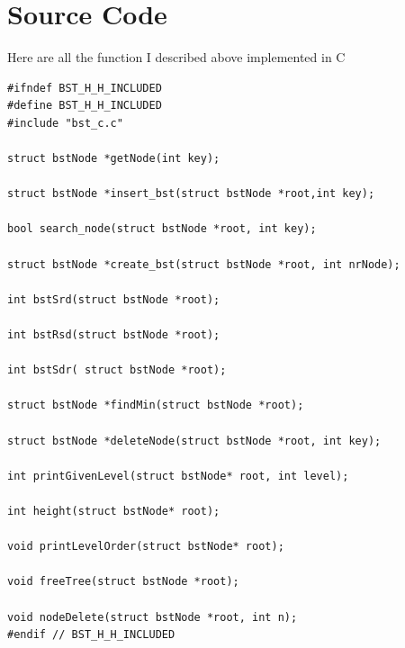 \documentclass{article}
\begin{document}
\section{Source Code}
Here are all the function I described above implemented in C
\begin{lstlisting}
#ifndef BST_H_H_INCLUDED
#define BST_H_H_INCLUDED
#include "bst_c.c"

struct bstNode *getNode(int key);

struct bstNode *insert_bst(struct bstNode *root,int key);

bool search_node(struct bstNode *root, int key);

struct bstNode *create_bst(struct bstNode *root, int nrNode);

int bstSrd(struct bstNode *root);

int bstRsd(struct bstNode *root);

int bstSdr( struct bstNode *root);

struct bstNode *findMin(struct bstNode *root);

struct bstNode *deleteNode(struct bstNode *root, int key);

int printGivenLevel(struct bstNode* root, int level);

int height(struct bstNode* root);

void printLevelOrder(struct bstNode* root);

void freeTree(struct bstNode *root);

void nodeDelete(struct bstNode *root, int n);
#endif // BST_H_H_INCLUDED

\end{lstlisting}
\end{document}
